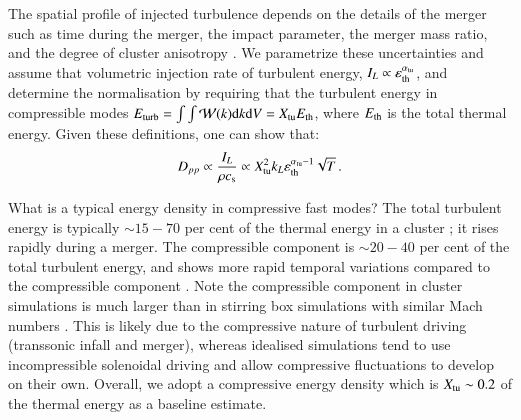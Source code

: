 \documentclass[fleqn,usenatbib,useAMS]{mnras}
\newcommand{\eps}{\varepsilon}
\begin{document}
The spatial profile of injected turbulence depends on the details of the
merger such as time during the merger, the impact parameter, the
merger mass ratio, and the degree of cluster anisotropy
\citep{miniati15}. We parametrize these uncertainties and
assume that volumetric injection rate of turbulent energy,
$I_L\propto \eps_\rmn{th}^{\alpha_\rmn{tu}}$, and determine the
normalisation by requiring that the turbulent energy in compressible
modes $E_{\mathrm{turb}}=\int \int \mathcal{W}(k) {\mathrm{d}}k {\mathrm{d}}V =
X_{\mathrm{tu}} E_{\mathrm{th}}$, where $E_{\mathrm{th}}$ is the total thermal
energy. Given these definitions, one can show that: 
\begin{equation}
  \label{eq:Dpp_scaling}
  D_{pp}\propto \frac{I_L}{\rho c_{\rmn{s}}} \propto 
X_\rmn{tu}^2k_L \eps_\rmn{th}^{\alpha_\rmn{tu}-1}\sqrt{T}\,.
\end{equation}

What is a typical energy density in compressive fast modes? The total turbulent
energy is typically $\sim 15-70$ per cent of the thermal energy in a cluster
\citep{vazza11}; it rises rapidly during a merger. The compressible component is
$\sim 20-40$ per cent of the total turbulent energy, and shows more rapid temporal
variations compared to the compressible component
\citep{2013ApJ...771..131B,miniati15}. Note the compressible component in
cluster simulations is much larger than in stirring box simulations
with similar Mach numbers \citep{kowal10,lynn14}. This is likely due to the
compressive nature of turbulent driving (transsonic infall and merger), whereas
idealised simulations tend to use incompressible solenoidal driving and allow
compressive fluctuations to develop on their own. Overall, we adopt a
compressive energy density which is $X_{\rm tu} \sim 0.2$ of the thermal energy
as a baseline estimate.
\end{document}
